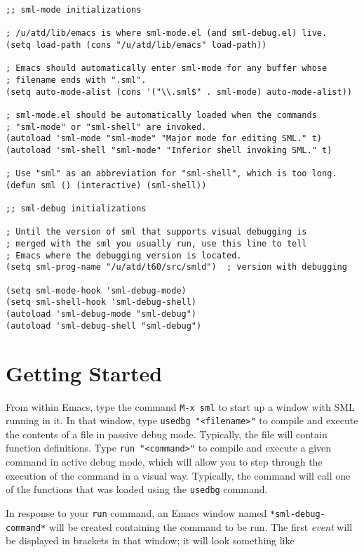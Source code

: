 \begin{verbatim}
;; sml-mode initializations

; /u/atd/lib/emacs is where sml-mode.el (and sml-debug.el) live.
(setq load-path (cons "/u/atd/lib/emacs" load-path))

; Emacs should automatically enter sml-mode for any buffer whose
; filename ends with ".sml".
(setq auto-mode-alist (cons '("\\.sml$" . sml-mode) auto-mode-alist)) 

; sml-mode.el should be automatically loaded when the commands
; "sml-mode" or "sml-shell" are invoked.
(autoload 'sml-mode "sml-mode" "Major mode for editing SML." t)
(autoload 'sml-shell "sml-mode" "Inferior shell invoking SML." t)

; Use "sml" as an abbreviation for "sml-shell", which is too long.
(defun sml () (interactive) (sml-shell))

;; sml-debug initializations

; Until the version of sml that supports visual debugging is
; merged with the sml you usually run, use this line to tell
; Emacs where the debugging version is located.
(setq sml-prog-name "/u/atd/t60/src/smld")	; version with debugging

(setq sml-mode-hook 'sml-debug-mode)
(setq sml-shell-hook 'sml-debug-shell)
(autoload 'sml-debug-mode "sml-debug")
(autoload 'sml-debug-shell "sml-debug")

\end{verbatim}

\section{Getting Started}
From within Emacs, type the command \verb'M-x sml' to start up a
window with SML running in it.  In that window, type
\verb'usedbg "<filename>"' to compile and execute the contents of a
file in passive debug mode.  Typically, the file will contain function
definitions.  Type \verb'run "<command>"' to compile and execute a
given command in active debug mode, which will allow you to step
through the execution of the command in a visual way.  Typically, the
command will call one of the functions that was loaded using the
\verb'usedbg' command.

In response to your \verb'run' command, an Emacs window named
\verb'*sml-debug-command*' will be created containing the command to
be run.  The first {\em event} will be displayed in brackets in that
window; it will look something like

